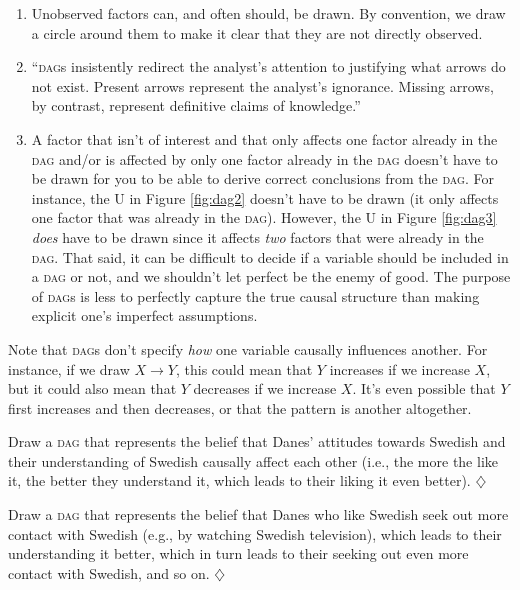 \documentclass[a4paper]{tufte-book}\usepackage[]{graphicx}\usepackage[]{xcolor}
\newcommand*{\parend}[1][$\diamondsuit$]{%
\leavevmode\unskip\penalty9999 \hbox{}\nobreak\hfill
    \quad\hbox{#1}%
}
\begin{document}
\begin{enumerate}
  \item Unobserved factors can, and often should, be drawn. By convention, we draw a circle around them to make it clear that they are not directly observed.

  \item ``\textsc{dag}s insistently redirect the analyst's attention to justifying what arrows do not exist. Present arrows represent the analyst's ignorance. Missing arrows, by contrast, represent definitive claims of knowledge.'' \citep[p. 248]{Elwert2013}

  \item A factor that isn't of interest 
  and that only affects one factor already in the \textsc{dag} 
  and/or is affected by only one factor already in the \textsc{dag} 
  doesn't have to be drawn for you to be able 
  to derive correct conclusions from the \textsc{dag}. 
  For instance, the U in Figure \ref{fig:dag2} doesn't have to be drawn 
  (it only affects one factor that was already in the \textsc{dag}). 
  However, the U in Figure \ref{fig:dag3} \emph{does} have to be drawn 
  since it affects \emph{two} factors that were already in the \textsc{dag}. 
  That said, it can be difficult to decide 
  if a variable should be included in a \textsc{dag} or not, 
  and we shouldn't let perfect be the enemy of good.
  The purpose of \textsc{dag}s is less to perfectly capture the true causal
  structure than making explicit one's imperfect assumptions.
\end{enumerate}

Note that \textsc{dag}s don't specify \emph{how} 
one variable causally influences another.
For instance, if we draw $X \rightarrow Y$, 
this could mean that $Y$ increases if we increase $X$, but it could also
mean that $Y$ decreases if we increase $X$.
It's even possible that $Y$ first increases and then decreases, or that
the pattern is another altogether.

Draw a \textsc{dag} that represents the belief that Danes' attitudes towards Swedish
and their understanding of Swedish causally affect each other (i.e., the more
the like it, the better they understand it, which leads to their liking it even better).
\parend

Draw a \textsc{dag} that represents the belief that Danes who like Swedish
seek out more contact with Swedish (e.g., by watching Swedish television), which
leads to their understanding it better, which in turn leads to their seeking out
even more contact with Swedish, and so on.
\parend
\end{document}
